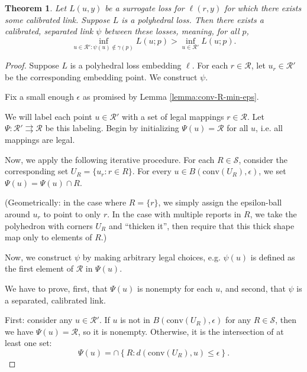 \documentclass{article}
\newcommand{\R}{\mathcal{R}}
\newcommand{\toto}{\rightrightarrows}
\newcommand{\conv}{\mathrm{conv}}
\newtheorem{theorem}{Theorem}
\begin{document}
\begin{theorem}
  Let $L(u,y)$ be a surrogate loss for $\ell(r,y)$ for which there exists some calibrated link.
  Suppose $L$ is a polyhedral loss.
  Then there exists a calibrated, \emph{separated} link $\psi$ between these losses, meaning, for all $p$,
    \[ \inf_{u \in \R' : \psi(u) \not\in \gamma(p)} L(u;p) > \inf_{u \in \R'} L(u;p) . \]
\end{theorem}

\begin{proof}
Suppose $L$ is a polyhedral loss embedding $\ell$.
For each $r \in \R$, let $u_r \in \R'$ be the corresponding embedding point.
We construct $\psi$.

Fix a small enough $\epsilon$ as promised by Lemma \ref{lemma:conv-R-min-eps}.

We will label each point $u \in \R'$ with a set of legal mappings $r \in \R$.
Let $\Psi: \R' \toto \R$ be this labeling.
Begin by initializing $\Psi(u) = \R$ for all $u$, i.e. all mappings are legal.

Now, we apply the following iterative procedure.
For each $R \in \mathcal{S}$, consider the corresponding set $U_R = \{u_r : r \in R\}$.
For every $u \in B\left(\conv(U_R), \epsilon\right)$, we set $\Psi(u) = \Psi(u) \cap R$.

(Geometrically: in the case where $R=\{r\}$, we simply assign the epsilon-ball around $u_r$ to point to only $r$. In the case with multiple reports in $R$, we take the polyhedron with corners $U_R$ and ``thicken it'', then require that this thick shape map only to elements of $R$.)

Now, we construct $\psi$ by making arbitrary legal choices, e.g. $\psi(u)$ is defined as the first element of $\R$ in $\Psi(u)$.

We have to prove, first, that $\Psi(u)$ is nonempty for each $u$, and second, that $\psi$ is a separated, calibrated link.

First: consider any $u \in \R'$.
If $u$ is not in $B(\conv(U_R),\epsilon)$ for any $R \in \mathcal{S}$, then we have $\Psi(u) = \R$, so it is nonempty.
Otherwise, it is the intersection of at least one set:
  \[ \Psi(u) = \cap \left\{ R : d(\conv(U_R),u) \leq \epsilon \right\} . \]


\end{proof}
\end{document}
